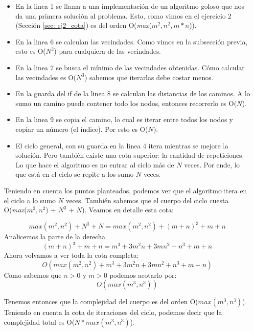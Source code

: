 \begin{itemize}
  \item En la linea 1 se llama a una implementación de un algoritmo goloso que nos da una primera solución al problema. Esto, como vimos en el ejercicio 2 (Sección \ref{sec: ej2_cota}) es del orden O(\textit{max}($m^2, n^2, m*n$)).
  \item En la linea 6 se calculan las vecindades. Como vimos en la subsección previa, esto es O($N^3$) para cualquiera de las vecindades.
  \item En la linea 7 se busca el mínimo de las vecindades obtenidas. Cómo calcular las vecindades es O($N^3$) sabemos que iterarlas debe costar menos.
  \item En la guarda del if de la linea 8 se calculan las distancias de los caminos. A lo sumo un camino puede contener todo los nodos, entonces recorrerlo es O($N$).
  \item En la linea 9 se copia el camino, lo cual es iterar entre todos los nodos y copiar un número (el índice). Por esto es O($N$).
  \item El ciclo general, con su guarda en la linea 4 itera mientras se mejore la solución. Pero también existe una cota superior: la cantidad de repeticiones. Lo que hace el algoritmo es no entrar al ciclo más de $N$ veces. Por ende, lo que está en el ciclo se repite a los sumo $N$ veces.
\end{itemize} 

Teniendo en cuenta los puntos planteados, podemos ver que el algoritmo itera en el ciclo a lo sumo $N$ veces. También sabemos que el cuerpo del ciclo cuesta O(\textit{max}($m^2, n^2$) + $N^3$ + $N$). Veamos en detalle esta cota:

\begin{equation}
  max(m^2, n^2) + N^3 + N = max(m^2, n^2) + (m+n)^3 + m + n
\end{equation}
Analicemos la parte de la derecha
\begin{equation}
  (m+n)^3 + m + n = m^3 + 3m^2n + 3mn^2 + n^3 + m + n
\end{equation}
Ahora volvamos a ver toda la cota completa:
\begin{equation}
  O( max(m^2, n^2) + m^3 + 3m^2n + 3mn^2 + n^3 + m + n )
\end{equation}
Como sabemos que $n > 0$ y $m > 0$ podemos acotarlo por:
\begin{equation}
  O( max(m^3, n^3) )
\end{equation}

Tenemos entonces que la complejidad del cuerpo es del orden O($max(m^3, n^3)$). Teniendo en cuenta la cota de iteraciones del ciclo, podemos decir que la complejidad total es O($N * max(m^3, n^3)$).

